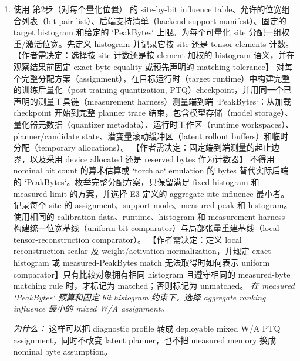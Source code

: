 \documentclass[10pt,a4paper]{article}
\begin{document}
\begin{enumerate}[leftmargin=*,start=2]
  \item 使用 第2步（对每个量化位置） 的 site-by-bit influence table、允许的位宽组合列表（bit-pair list）、后端支持清单（backend support manifest）、固定的 target histogram 和给定的 `PeakBytes` 上限。为每个可量化 site 分配一组权重/激活位宽。先定义 histogram 并记录它按 site 还是 tensor elements 计数。 【作者需决定：选择按 site 计数还是按 element 加权的 histogram 语义，并在观察结果前固定 exact byte equality 或预先声明的 matching tolerance】 对每个完整分配方案（assignment），在目标运行时（target runtime）中构建完整的训练后量化（post-training quantization, PTQ）checkpoint，并用同一个已声明的测量工具链（measurement harness）测量端到端 `PeakBytes`：从加载 checkpoint 开始到完整 planner trace 结束，包含模型存储（model storage）、量化器元数据（quantizer metadata）、运行时工作区（runtime workspaces）、planner/candidate state、潜变量滚动缓冲区（latent rollout buffers）和临时分配（temporary allocations）。 【作者需决定：固定端到端测量的起止边界，以及采用 device allocated 还是 reserved bytes 作为计数器】 不得用 nominal bit count 的算术估算或 `torch.ao` emulation 的 bytes 替代实际后端的 `PeakBytes`。枚举完整分配方案，只保留满足 fixed histogram 和 measured limit 的方案，并选择 E3 定义的 aggregate site influence 最小者。记录每个 site 的 assignment、support mode、measured peak 和 histogram。使用相同的 calibration data、runtime、histogram 和 measurement harness 构建统一位宽基线（uniform-bit comparator）与局部张量重建基线（local tensor-reconstruction comparator）。 【作者需决定：定义 local reconstruction scalar 及 weight/activation normalization，并规定 exact histogram 或 measured-PeakBytes match 无法取得时如何表示 uniform comparator】只有比较对象拥有相同 histogram 且遵守相同的 measured-byte matching rule 时，才标记为 matched；否则标记为 unmatched。
\noindent\emph{在 measured `PeakBytes` 预算和固定 bit histogram 约束下，选择 aggregate ranking influence 最小的 mixed W/A assignment。}
\par{}
\par\emph{为什么：} 这样可以把 diagnostic profile 转成 deployable mixed W/A PTQ assignment，同时不改变 latent planner，也不把 measured memory 换成 nominal byte assumption。
\end{enumerate}
\end{document}
